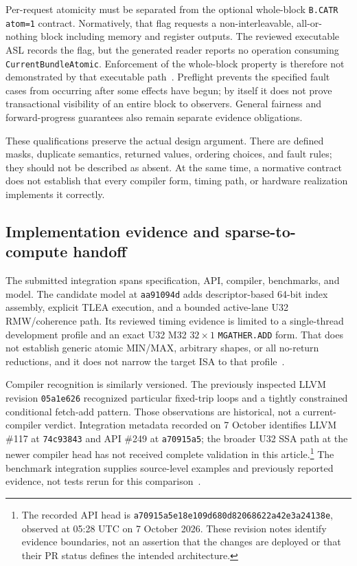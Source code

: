 Per-request atomicity must be separated from the optional whole-block \texttt{B.CATR atom=1} contract. Normatively, that flag requests a non-interleavable, all-or-nothing block including memory and register outputs. The reviewed executable ASL records the flag, but the generated reader reports no operation consuming \texttt{CurrentBundleAtomic}. Enforcement of the whole-block property is therefore not demonstrated by that executable path~\citep{u004_spec_bcatr}. Preflight prevents the specified fault cases from occurring after some effects have begun; by itself it does not prove transactional visibility of an entire block to observers. General fairness and forward-progress guarantees also remain separate evidence obligations.

These qualifications preserve the actual design argument. There are defined masks, duplicate semantics, returned values, ordering choices, and fault rules; they should not be described as absent. At the same time, a normative contract does not establish that every compiler form, timing path, or hardware realization implements it correctly.

\subsection{Implementation evidence and sparse-to-compute handoff}

The submitted integration spans specification, API, compiler, benchmarks, and model. The candidate model at \texttt{aa91094d} adds descriptor-based 64-bit index assembly, explicit TLEA execution, and a bounded active-lane U32 RMW/coherence path. Its reviewed timing evidence is limited to a single-thread development profile and an exact U32 M32 $32\times1$ \texttt{MGATHER.ADD} form. That does not establish generic atomic MIN/MAX, arbitrary shapes, or all no-return reductions, and it does not narrow the target ISA to that profile~\citep{u004_model_candidate}.

Compiler recognition is similarly versioned. The previously inspected LLVM revision \texttt{05a1e626} recognized particular fixed-trip loops and a tightly constrained conditional fetch-add pattern. Those observations are historical, not a current-compiler verdict. Integration metadata recorded on 7 October identifies LLVM \#117 at \texttt{74c93843} and API \#249 at \texttt{a70915a5}; the broader U32 SSA path at the newer compiler head has not received complete validation in this article.\footnote{The recorded API head is \texttt{a70915a5e18e109d680d82068622a42e3a24138e}, observed at 05:28 UTC on 7 October 2026. These revision notes identify evidence boundaries, not an assertion that the changes are deployed or that their PR status defines the intended architecture.} The benchmark integration supplies source-level examples and previously reported evidence, not tests rerun for this comparison~\citep{u004_compiler_integration,u004_api_integration,u004_bench_integration}.

